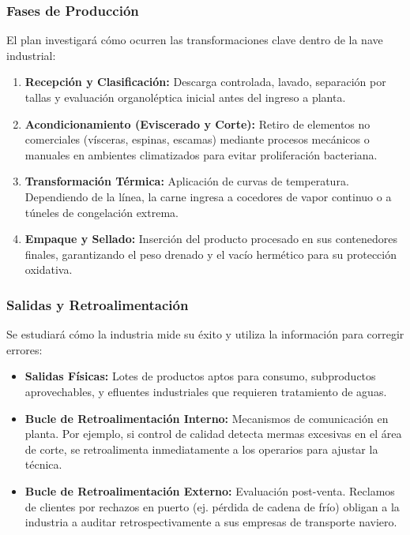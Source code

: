 \documentclass[11pt,a4paper]{article}
\begin{document}
\subsubsection{Fases de Producción }
El plan investigará cómo ocurren las transformaciones clave dentro de la nave industrial:
\begin{enumerate}[noitemsep]
    \item \textbf{Recepción y Clasificación:} Descarga controlada, lavado, separación por tallas y evaluación organoléptica inicial antes del ingreso a planta.
    \item \textbf{Acondicionamiento (Eviscerado y Corte):} Retiro de elementos no comerciales (vísceras, espinas, escamas) mediante procesos mecánicos o manuales en ambientes climatizados para evitar proliferación bacteriana.
    \item \textbf{Transformación Térmica:} Aplicación de curvas de temperatura. Dependiendo de la línea, la carne ingresa a cocedores de vapor continuo o a túneles de congelación extrema.
    \item \textbf{Empaque y Sellado:} Inserción del producto procesado en sus contenedores finales, garantizando el peso drenado y el vacío hermético para su protección oxidativa.
\end{enumerate}

\subsubsection{Salidas y Retroalimentación }
Se estudiará cómo la industria mide su éxito y utiliza la información para corregir errores:
\begin{itemize}[noitemsep]
    \item \textbf{Salidas Físicas:} Lotes de productos aptos para consumo, subproductos aprovechables, y efluentes industriales que requieren tratamiento de aguas.
    \item \textbf{Bucle de Retroalimentación Interno:} Mecanismos de comunicación en planta. Por ejemplo, si control de calidad detecta mermas excesivas en el área de corte, se retroalimenta inmediatamente a los operarios para ajustar la técnica.
    \item \textbf{Bucle de Retroalimentación Externo:} Evaluación post-venta. Reclamos de clientes por rechazos en puerto (ej. pérdida de cadena de frío) obligan a la industria a auditar retrospectivamente a sus empresas de transporte naviero.
\end{itemize}
\end{document}
